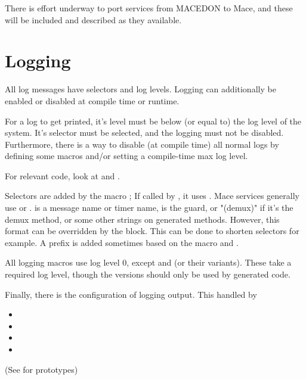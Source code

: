 There is effort underway to port services from MACEDON to Mace, and these 
will be included and described as they available.

\section{Logging}
\label{sec:log}
All log messages have selectors and log levels.  Logging can
additionally be enabled or disabled at compile time or runtime.

For a log to get printed, it's level must be below (or equal to) the log
level of the system.  It's selector must be selected, and the logging
must not be disabled.  Furthermore, there is a way to disable (at
compile time) all normal logs by defining some macros and/or setting a
compile-time max log level.

For relevant code, look at  and
.

Selectors are added by the macro ;  If called by
, it uses
.  Mace services
generally use  or
.
 is a message name or
timer name,  is the guard, or "(demux)" if it's the demux method,
or some other strings on generated methods. However, this format can be
overridden by the  block.  This can be done
to shorten selectors for example.  A prefix is added sometimes
based on the macro and .

All logging macros use log level 0, except  and
 (or their  variants).  These take
a required log level, though the  versions should only be used
by generated code.

Finally, there is the configuration of logging output.  This handled by
\begin{itemize}
\item {}
\item {}
\item {}
\item {}
\end{itemize}

(See  for prototypes)

